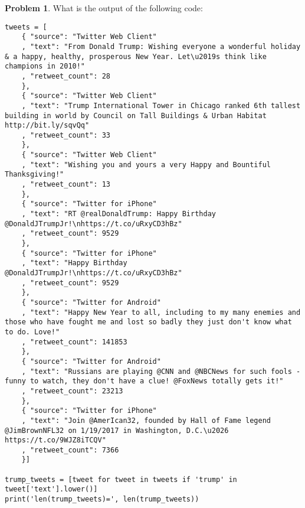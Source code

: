 \documentclass[10pt]{article}
\theoremstyle{definition}
\newtheorem{problem}{Problem}
\begin{document}
\newpage
\begin{problem}
    What is the output of the following code:
\end{problem}
\begin{lstlisting}
tweets = [
    { "source": "Twitter Web Client"
    , "text": "From Donald Trump: Wishing everyone a wonderful holiday & a happy, healthy, prosperous New Year. Let\u2019s think like champions in 2010!"
    , "retweet_count": 28
    }, 
    { "source": "Twitter Web Client"
    , "text": "Trump International Tower in Chicago ranked 6th tallest building in world by Council on Tall Buildings & Urban Habitat http://bit.ly/sqvQq"
    , "retweet_count": 33
    },
    { "source": "Twitter Web Client"
    , "text": "Wishing you and yours a very Happy and Bountiful Thanksgiving!"
    , "retweet_count": 13
    },
    { "source": "Twitter for iPhone"
    , "text": "RT @realDonaldTrump: Happy Birthday @DonaldJTrumpJr!\nhttps://t.co/uRxyCD3hBz"
    , "retweet_count": 9529
    },
    { "source": "Twitter for iPhone"
    , "text": "Happy Birthday @DonaldJTrumpJr!\nhttps://t.co/uRxyCD3hBz"
    , "retweet_count": 9529
    },
    { "source": "Twitter for Android"
    , "text": "Happy New Year to all, including to my many enemies and those who have fought me and lost so badly they just don't know what to do. Love!"
    , "retweet_count": 141853
    },
    { "source": "Twitter for Android"
    , "text": "Russians are playing @CNN and @NBCNews for such fools - funny to watch, they don't have a clue! @FoxNews totally gets it!"
    , "retweet_count": 23213
    },
    { "source": "Twitter for iPhone"
    , "text": "Join @AmerIcan32, founded by Hall of Fame legend @JimBrownNFL32 on 1/19/2017 in Washington, D.C.\u2026 https://t.co/9WJZ8iTCQV"
    , "retweet_count": 7366
    }]

trump_tweets = [tweet for tweet in tweets if 'trump' in tweet['text'].lower()]
print('len(trump_tweets)=', len(trump_tweets))
\end{lstlisting}
\vspace{1.5in}
\end{document}
